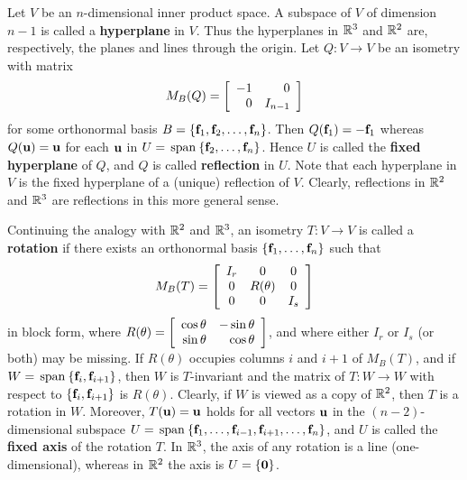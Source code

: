 Let $V$ be an $n$-dimensional inner product space. A subspace of $V$ of dimension $n - 1$ is called a \textbf{hyperplane} in $V$. Thus the hyperplanes in $\mathbb{R}^3$ and $\mathbb{R}^2$ are, respectively, the planes and lines through the origin. Let $Q : V \to V$ be an isometry with matrix
\begin{equation*}
M_B(Q) =
\left[ \begin{array}{rr}
-1 & 0 \\
0 & I_{n - 1}
\end{array} \right]
\end{equation*}
for some orthonormal basis $B = \{\textbf{f}_{1}, \textbf{f}_{2}, \dots, \textbf{f}_{n}\}$. Then $Q(\textbf{f}_{1}) = -\textbf{f}_{1}$ whereas $Q(\textbf{u}) = \textbf{u}$ for each $\textbf{u}$ in $U = \thinspace\operatorname{span\medspace} \{\textbf{f}_{2}, \dots, \textbf{f}_{n}\}$. Hence $U$ is called the \textbf{fixed hyperplane} of $Q$, and $Q$ is called \textbf{reflection} in $U$. Note that each hyperplane in $V$ is the fixed hyperplane of a (unique) reflection of $V$. Clearly, reflections in $\mathbb{R}^2$ and $\mathbb{R}^3$ are reflections in this more general sense.

Continuing the analogy with $\mathbb{R}^2$ and $\mathbb{R}^3$, an isometry $T : V \to V$ is called a \textbf{rotation} if there exists an orthonormal basis $\{\textbf{f}_{1}, \dots, \textbf{f}_{n}\}$ such that
\begin{equation*}
M_B(T) = \left[ \begin{array}{ccc}
I_r & 0 & 0 \\
0 & R(\theta) & 0 \\
0 & 0 & I_s 
\end{array} \right]
\end{equation*}
in block form, where $R(\theta) = 
\left[ \begin{array}{rr}
\cos \theta & - \sin \theta \\
\sin \theta & \cos \theta
\end{array} \right]$, and where either $I_{r}$ or $I_{s}$ (or both) may be missing. If
$R(\theta)$ occupies columns $i$ and $i + 1$ of $M_{B}(T)$, and if $W = \thinspace\operatorname{span\medspace}\{\textbf{f}_{i}, \textbf{f}_{i+1}\}$, then $W$ is $T$-invariant and the matrix of $T : W \to W$ with respect to $\{\textbf{f}_{i}, \textbf{f}_{i+1}\}$ is $R(\theta)$. Clearly, if $W$ is
viewed as a copy of $\mathbb{R}^2$, then $T$ is a rotation in $W$. Moreover, $T(\textbf{u}) = \textbf{u}$ holds for all vectors $\textbf{u}$ in the $(n - 2)$-dimensional subspace $U = \thinspace\operatorname{span\medspace}\{\textbf{f}_{1}, \dots, \textbf{f}_{i-1}, \textbf{f}_{i+1}, \dots, \textbf{f}_{n}\}$, and $U$ is called the \textbf{fixed axis} of the rotation $T$. In $\mathbb{R}^3$, the axis of any rotation is a line (one-dimensional), whereas in $\mathbb{R}^2$ the axis is $U = \{\textbf{0}\}$.

